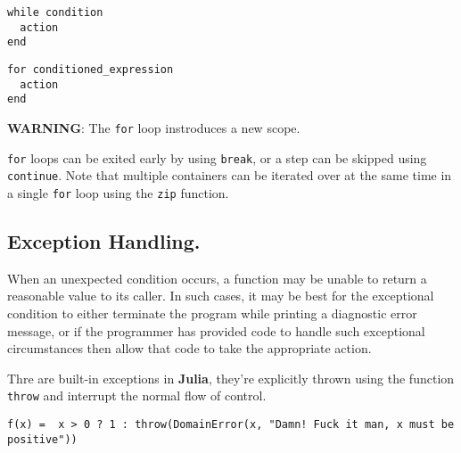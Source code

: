 \documentclass[
]{article}
\begin{document}
\begin{verbatim}
while condition
  action
end
\end{verbatim}

\begin{verbatim}
for conditioned_expression
  action
end
\end{verbatim}

\textbf{WARNING}: The \texttt{for} loop instroduces a new scope.

\texttt{for} loops can be exited early by using \texttt{break}, or a
step can be skipped using \texttt{continue}. Note that multiple
containers can be iterated over at the same time in a single
\texttt{for} loop using the \texttt{zip} function.

\hypertarget{exception-handling.}{%
\subsection{\texorpdfstring{\textbf{Exception
Handling}.}{Exception Handling.}}\label{exception-handling.}}

When an unexpected condition occurs, a function may be unable to return
a reasonable value to its caller. In such cases, it may be best for the
exceptional condition to either terminate the program while printing a
diagnostic error message, or if the programmer has provided code to
handle such exceptional circumstances then allow that code to take the
appropriate action.

Thre are built-in exceptions in \textbf{Julia}, they're explicitly
thrown using the function \texttt{throw} and interrupt the normal flow
of control.

\begin{verbatim}
f(x) =  x > 0 ? 1 : throw(DomainError(x, "Damn! Fuck it man, x must be positive"))
\end{verbatim}
\end{document}
